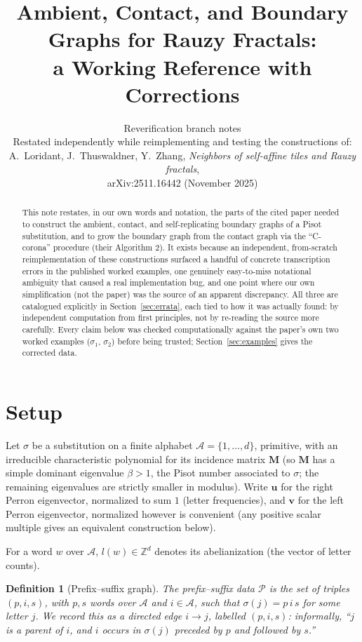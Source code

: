 \documentclass[11pt]{article}
\title{Ambient, Contact, and Boundary Graphs for Rauzy Fractals:\\
a Working Reference with Corrections}
\author{Reverification branch notes\\
\small Restated independently while reimplementing and testing the constructions of:\\
\small A.~Loridant, J.~Thuswaldner, Y.~Zhang, \emph{Neighbors of self-affine tiles and Rauzy fractals},\\
\small arXiv:2511.16442 (November 2025)}
\date{}
\newtheorem{definition}{Definition}
\begin{document}
\maketitle

\begin{abstract}
This note restates, in our own words and notation, the parts of the cited paper
needed to construct the ambient, contact, and self-replicating boundary graphs
of a Pisot substitution, and to grow the boundary graph from the contact graph
via the ``C-corona'' procedure (their Algorithm 2). It exists because an
independent, from-scratch reimplementation of these constructions surfaced a
handful of concrete transcription errors in the published worked examples, one
genuinely easy-to-miss notational ambiguity that caused a real implementation
bug, and one point where our own simplification (not the paper) was the source
of an apparent discrepancy. All three are catalogued explicitly in
Section~\ref{sec:errata}, each tied to how it was actually found: by
independent computation from first principles, not by re-reading the source
more carefully. Every claim below was checked computationally against the
paper's own two worked examples ($\sigma_1$, $\sigma_2$) before being trusted;
Section~\ref{sec:examples} gives the corrected data.
\end{abstract}

\section{Setup}

Let $\sigma$ be a substitution on a finite alphabet $\mathcal{A}=\{1,\dots,d\}$,
primitive, with an irreducible characteristic polynomial for its incidence
matrix $\mathbf{M}$ (so $\mathbf{M}$ has a simple dominant eigenvalue $\beta>1$,
the Pisot number associated to $\sigma$; the remaining eigenvalues are strictly
smaller in modulus). Write $\mathbf{u}$ for the right Perron eigenvector,
normalized to sum $1$ (letter frequencies), and $\mathbf{v}$ for the left
Perron eigenvector, normalized however is convenient (any positive scalar
multiple gives an equivalent construction below).

For a word $w$ over $\mathcal{A}$, $l(w)\in\mathbb{Z}^d$ denotes its
abelianization (the vector of letter counts).

\begin{definition}[Prefix--suffix graph]
The prefix--suffix data $\mathcal{P}$ is the set of triples $(p,i,s)$, with
$p,s$ words over $\mathcal{A}$ and $i\in\mathcal{A}$, such that
$\sigma(j)=p\,i\,s$ for some letter $j$. We record this as a directed edge
$i\to j$, labelled $(p,i,s)$: informally, ``$j$ is a parent of $i$, and $i$
occurs in $\sigma(j)$ preceded by $p$ and followed by $s$.''
\end{definition}
\end{document}
